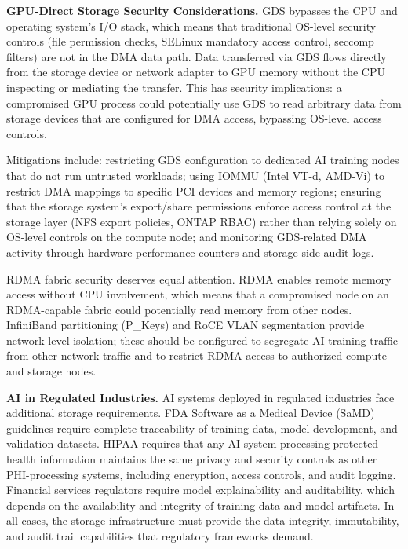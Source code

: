 \begin{securitybox}
\textbf{GPU-Direct Storage Security Considerations.}
GDS bypasses the CPU and operating system's I/O stack, which means that
traditional OS-level security controls (file permission checks, SELinux
mandatory access control, seccomp filters) are not in the DMA data path. Data
transferred via GDS flows directly from the storage device or network adapter
to GPU memory without the CPU inspecting or mediating the transfer. This has
security implications: a compromised GPU process could potentially use GDS to
read arbitrary data from storage devices that are configured for DMA access,
bypassing OS-level access controls.

Mitigations include: restricting GDS configuration to dedicated AI training
nodes that do not run untrusted workloads; using IOMMU (Intel VT-d, AMD-Vi)
to restrict DMA mappings to specific PCI devices and memory regions; ensuring
that the storage system's export/share permissions enforce access control at
the storage layer (NFS export policies, ONTAP RBAC) rather than relying
solely on OS-level controls on the compute node; and monitoring GDS-related
DMA activity through hardware performance counters and storage-side audit
logs.

RDMA fabric security deserves equal attention. RDMA enables remote memory
access without CPU involvement, which means that a compromised node on an
RDMA-capable fabric could potentially read memory from other nodes.
InfiniBand partitioning (P\_Keys) and RoCE VLAN segmentation provide
network-level isolation; these should be configured to segregate AI training
traffic from other network traffic and to restrict RDMA access to authorized
compute and storage nodes.

\textbf{AI in Regulated Industries.}
AI systems deployed in regulated industries face additional storage
requirements. FDA Software as a Medical Device (SaMD) guidelines require
complete traceability of training data, model development, and validation
datasets. HIPAA requires that any AI system processing protected health
information maintains the same privacy and security controls as other
PHI-processing systems, including encryption, access controls, and audit
logging. Financial services regulators require model explainability and
auditability, which depends on the availability and integrity of training data
and model artifacts. In all cases, the storage infrastructure must provide the
data integrity, immutability, and audit trail capabilities that regulatory
frameworks demand.


\end{securitybox}
